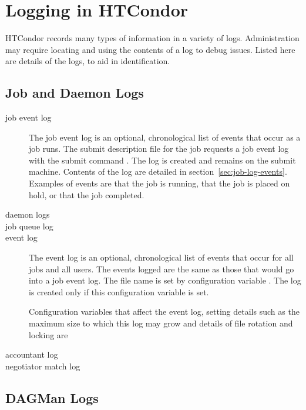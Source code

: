 \section{\label{sec:logging}Logging in HTCondor}
HTCondor records many types of information in a variety of logs.
Administration may require locating and using the
contents of a log to debug issues.
Listed here are details of the logs, to aid in identification.

\subsection{\label{sec:job-systemlogs}Job and Daemon Logs}
\begin{description}
\item[job event log]
  The job event log is an optional, chronological list of events that occur
  as a job runs.
  The submit description file for the job requests a job event log with
  the submit command .
  The log is created and remains on the submit machine.
  Contents of the log are detailed in section~\ref{sec:job-log-events}.
  Examples of events are that the job is running,
  that the job  is placed on hold, or that the job completed.
\item[daemon logs]
\item[job queue log]
\item[event log]
  The event log is an optional, chronological list of events that occur
  for all jobs and all users.
  The events logged are the same as those that would go into a job event
  log.
  The file name is set by configuration variable .
  The log is created only if this configuration variable is set.

  Configuration variables that affect the event log, 
  setting details such as
  the maximum size to which this log may grow and details of file rotation
  and locking are
  \begin{description}
  \item [] 
  \item []
  \item []
  \item []
  \item []
  \item []
  \item []
  \end{description}

  
\item[accountant log]
\item[negotiator match log]
\end{description}
\MoreTodo

\subsection{\label{sec:DAGMan-logs}DAGMan Logs}
\MoreTodo

